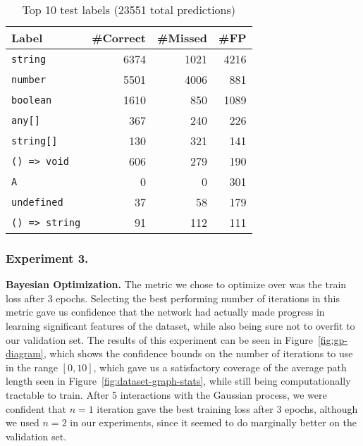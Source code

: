 \begin{table}
  \centering
  {\renewcommand{\arraystretch}{1.3}%
  \begin{tabular}{lrrr}
    \textbf{Label} & \textbf{\#Correct} & \textbf{\#Missed} & \textbf{\#FP} \\
    \hline
    \texttt{string} & 6374 & 1021 & 4216 \\
    \texttt{number} & 5501 & 4006 & 881 \\
    \texttt{boolean} & 1610 & 850 & 1089 \\
    \texttt{any[]} & 367 & 240 & 226 \\
    \texttt{string[]} & 130 & 321 & 141 \\
    \texttt{() => void} & 606 & 279 & 190 \\
    \texttt{A}  & 0 & 0 & 301 \\
    \texttt{undefined} & 37 & 58 & 179 \\
    \texttt{() => string} & 91 & 112 & 111
  \end{tabular}
   }
  \caption{Top 10 test labels (23551 total predictions)}\label{tab:test-fps}
\end{table}

\subsubsection{Experiment 3.}
\textbf{Bayesian Optimization.}
The metric we chose to optimize over was the train loss after 3 epochs.
Selecting the best performing number of iterations in this metric gave us confidence that the network had actually made progress in learning significant features of the dataset, while also being sure not to overfit to our validation set.
The results of this experiment can be seen in Figure~\ref{fig:gp-diagram}, which shows the confidence bounds on the number of iterations to use in the range $[0, 10]$, which gave us a satisfactory coverage of the average path length seen in Figure~\ref{fig:dataset-graph-stats}, while still being computationally tractable to train.
After 5 interactions with the Gaussian process, we were confident that $n=1$ iteration gave the best training loss after 3 epochs, although we used $n=2$ in our experiments, since it seemed to do marginally better on the validation set.

